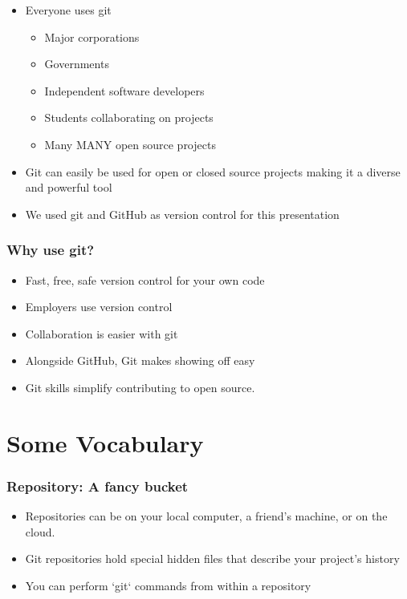 \documentclass[unknownkeysallowed]{beamer}
\begin{document}
\begin{frame}
\begin{figure}
\begin{center}
                \end{center}
            \endminipage
        \end{figure}
    \begin{itemize}
        \item{Everyone uses git}
            \begin{itemize}
                \item{Major corporations}
                \item{Governments}
                \item{Independent software developers}
                \item{Students collaborating on projects}
                \item{Many MANY open source projects}
           \end{itemize}
        \item{Git can easily be used for open or closed source projects making it a diverse and powerful tool}
        \item{We used git and GitHub as version control for this presentation}
    \end{itemize}
\end{frame}

\begin{frame}
    \frametitle{Why use git?}
    \begin{itemize}
    	\item{Fast, free, safe version control for your own code}
        \vspace{0.25cm}
        \item{Employers use version control}
        \vspace{0.25cm}
        \item{Collaboration is easier with git}
        \vspace{0.25cm}
        \item{Alongside GitHub, Git makes showing off easy}
        \vspace{0.25cm}
        \item{Git skills simplify contributing to open source.}
    \end{itemize}
\end{frame}

\section{Some Vocabulary}
\begin{frame}
	\frametitle{Repository: A fancy bucket}
	\begin{itemize}
	    \item{Repositories can be on your local computer, a friend's machine, or on the cloud.}
        \vspace{0.5cm}
	    \item{Git repositories hold special hidden files that describe your project's history}
        \vspace{0.5cm}
	    \item{You can perform `git` commands from within a repository}
	\end{itemize}
\end{frame}
\end{document}
